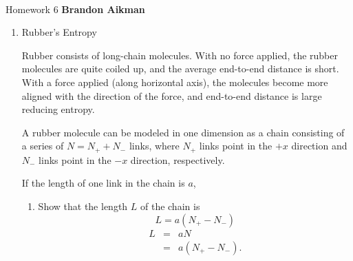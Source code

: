 \documentclass[12pt]{article}
\begin{document}
 \\
Homework 6 \hfill {\bf Brandon Aikman}

\begin{enumerate}
	\item Rubber's Entropy

	Rubber consists of long-chain molecules. With no force applied, the rubber molecules are quite coiled up, and the average end-to-end distance is short. With a force applied (along horizontal axis), the molecules become more aligned with the direction of the force, and end-to-end distance is large reducing entropy.

	A rubber molecule can be modeled in one dimension as a chain consisting of a series of $N = N_+ + N_-$ links, where $N_+$ links point in the $+x$ direction and $N_-$ links point in the $-x$ direction, respectively.
    
    If the length of one link in the chain is $a$,

	\begin{enumerate}
		\item Show that the length $L$ of the chain is $$L = a(N_+ - N_-)$$
		\begin{eqnarray*}
            L &=& aN \\
            &=& a(N_+ - N_-).
        \end{eqnarray*}
       

\end{enumerate}
\end{enumerate}
\end{document}
